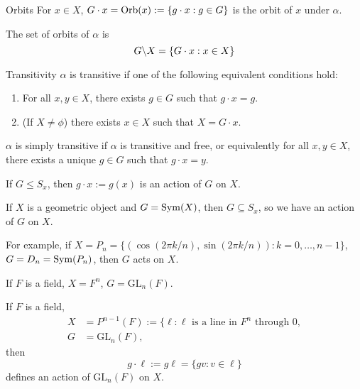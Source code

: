 \documentclass{article}
\begin{document}
\begin{definition}{Orbits}
    For $x\in X$, $G\cdot x = \operatorname{Orb}(x):=\{g\cdot x:g\in G\}$ is the orbit of $x$ under $\alpha$.
    \vspace{2mm}

    The set of orbits of $\alpha$ is
    \begin{equation*}
        G\text{\textbackslash} X = \{G\cdot x:x\in X\}
    \end{equation*}
\end{definition}
\begin{definition}{Transitivity}
    $\alpha$ is transitive if one of the following equivalent conditions hold:
    \begin{enumerate}
        \item For all $x,y\in X$, there exists $g\in G$ such that $g\cdot x=g$.
        \item (If $X \neq \phi$) there exists $x\in X$ such that $X=G\cdot x$.
    \end{enumerate}
    $\alpha$ is simply transitive if $\alpha$ is transitive and free, or equivalently for all $x,y\in X$, there exists a unique $g\in G$ such that $g\cdot x = y$.
\end{definition}
\begin{example}
    If $G\le S_x$, then $g\cdot x:= g(x)$ is an action of $G$ on $X$.
\end{example}
\begin{example}
    If $X$ is a geometric object and $G=\mathrm{Sym}(X)$, then $G \subseteq S_x$, so we have an action of $G$ on $X$.
    \vspace{2mm}

    For example, if $X=P_n=\{(\cos(2\pi k/n),\sin(2\pi k/n)):k=0,\dots,n-1\}$, $G=D_n=\mathrm{Sym}(P_n)$, then $G$ acts on $X$.
    \vspace{2mm}

    If $F$ is a field, $X=F^n$, $G=\text{GL}_n(F)$.
\end{example}
\begin{example}
    If $F$ is a field,
    \begin{align*}
        X &= P^{n-1}(F) := \{\ell : \ell \text{ is a line in $F^n$ through $0$}, \\ 
        G &= \text{GL}_n(F),
    \end{align*}
    then
    \begin{equation*}
        g\cdot \ell := g\ell = \{gv:v\in \ell\}
    \end{equation*}
    defines an action of $\text{GL}_n(F)$ on $X$.
\end{example}
\end{document}
